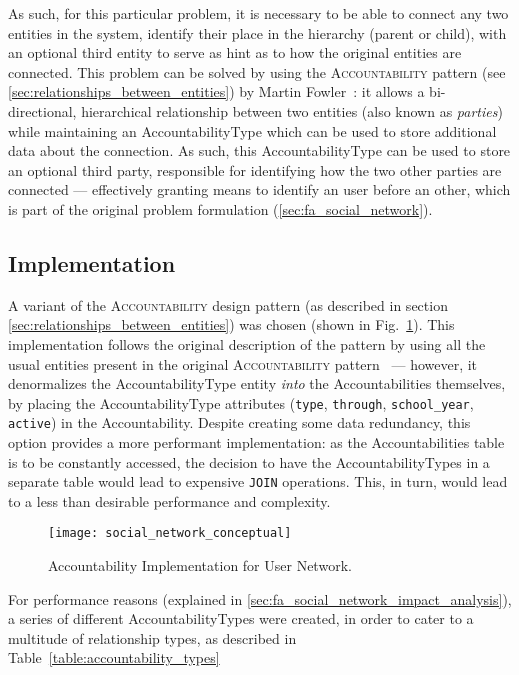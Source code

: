 As such, for this particular problem, it is necessary to be able to connect any two entities in the system, identify their place in the hierarchy (parent or child), with an optional third entity to serve as hint as to how the original entities are connected. This problem can be solved by using the \textsc{Accountability} pattern (see \ref{sec:relationships_between_entities}) by Martin Fowler~\cite{fowler_accountability}: it allows a bi-directional, hierarchical relationship between two entities (also known as \emph{parties}) while maintaining an AccountabilityType which can be used to store additional data about the connection. As such, this AccountabilityType can be used to store an optional third party, responsible for identifying how the two other parties are connected --- effectively granting means to identify an user before an other, which is part of the original problem formulation (\ref{sec:fa_social_network}).

\subsection{Implementation}\label{sec:fa_social_network_implementation}

A variant of the \textsc{Accountability} design pattern (as described in section \ref{sec:relationships_between_entities}) was chosen (shown in Fig.~\ref{fig:social_network_conceptual}). This implementation follows the original description of the pattern by using all the usual entities present in the original \textsc{Accountability} pattern~\cite{fowler_accountability} --- however, it denormalizes the AccountabilityType entity \emph{into} the Accountabilities themselves, by placing the AccountabilityType attributes (\texttt{type}, \texttt{through}, \texttt{school\_year}, \texttt{active}) in the Accountability. Despite creating some data redundancy, this option provides a more performant implementation: as the Accountabilities table is to be constantly accessed, the decision to have the AccountabilityTypes in a separate table would lead to expensive \texttt{JOIN} operations. This, in turn, would lead to a less than desirable performance and complexity.

\begin{figure}[H]
  \centering
  \texttt{[image: social\_network\_conceptual]}
  \caption{Accountability Implementation for User Network.}
  \label{fig:social_network_conceptual}
\end{figure}

For performance reasons (explained in \ref{sec:fa_social_network_impact_analysis}), a series of different AccountabilityTypes were created, in order to cater to a multitude of relationship types, as described in Table~\ref{table:accountability_types}

